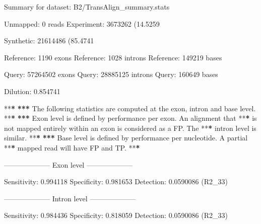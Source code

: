 \documentclass[]{article}
\newenvironment{Shaded}{\begin{snugshade}}{\end{snugshade}}
\newcommand{\DecValTok}[1]{\textcolor[rgb]{0.00,0.00,0.81}{{#1}}}
\newcommand{\FloatTok}[1]{\textcolor[rgb]{0.00,0.00,0.81}{{#1}}}
\newcommand{\StringTok}[1]{\textcolor[rgb]{0.31,0.60,0.02}{{#1}}}
\newcommand{\ErrorTok}[1]{\textbf{{#1}}}
\newcommand{\NormalTok}[1]{{#1}}
\begin{document}
\begin{Shaded}
\begin{Highlighting}[]
\NormalTok{Summary for dataset:}\StringTok{ }\NormalTok{B2/TransAlign_summary.stats}

   \NormalTok{Unmapped:}\StringTok{   }\DecValTok{0} \NormalTok{reads}
   \NormalTok{Experiment:}\StringTok{ }\DecValTok{3673262} \NormalTok{(}\FloatTok{14.5259}\NormalTok{%
   \NormalTok{Synthetic:}\StringTok{  }\DecValTok{21614486} \NormalTok{(}\FloatTok{85.4741}\NormalTok{%

   \NormalTok{Reference:}\StringTok{  }\DecValTok{1190} \NormalTok{exons}
   \NormalTok{Reference:}\StringTok{  }\DecValTok{1028} \NormalTok{introns}
   \NormalTok{Reference:}\StringTok{  }\DecValTok{149219} \NormalTok{bases}

   \NormalTok{Query:}\StringTok{      }\DecValTok{57264502} \NormalTok{exons}
   \NormalTok{Query:}\StringTok{      }\DecValTok{28885125} \NormalTok{introns}
   \NormalTok{Query:}\StringTok{      }\DecValTok{160649} \NormalTok{bases}

   \NormalTok{Dilution:}\StringTok{   }\FloatTok{0.854741}

   \NormalTok{**}\ErrorTok{*}
\StringTok{   }\ErrorTok{***}\StringTok{ }\NormalTok{The following statistics are computed at the exon, intron and base level.}
   \NormalTok{**}\ErrorTok{*}
\StringTok{   }\ErrorTok{***}\StringTok{ }\NormalTok{Exon level is defined by performance per exon. An alignment that}
   \NormalTok{**}\ErrorTok{*}\StringTok{ }\NormalTok{is not mapped entirely within an exon is considered as a FP. The}
   \NormalTok{**}\ErrorTok{*}\StringTok{ }\NormalTok{intron level is similar.}
   \NormalTok{**}\ErrorTok{*}
\StringTok{   }\ErrorTok{***}\StringTok{ }\NormalTok{Base level is defined by performance per nucleotide. A partial}
   \NormalTok{**}\ErrorTok{*}\StringTok{ }\NormalTok{mapped read will have FP and TP.}
   \NormalTok{**}\ErrorTok{*}

\StringTok{   }\NormalTok{--------------------}\StringTok{ }\NormalTok{Exon level --------------------}

\StringTok{   }\NormalTok{Sensitivity:}\StringTok{ }\FloatTok{0.994118}
   \NormalTok{Specificity:}\StringTok{ }\FloatTok{0.981653}
   \NormalTok{Detection:}\StringTok{   }\FloatTok{0.0590086} \NormalTok{(R2_33)}

   \NormalTok{--------------------}\StringTok{ }\NormalTok{Intron level --------------------}

\StringTok{   }\NormalTok{Sensitivity:}\StringTok{ }\FloatTok{0.984436}
   \NormalTok{Specificity:}\StringTok{ }\FloatTok{0.818059}
   \NormalTok{Detection:}\StringTok{   }\FloatTok{0.0590086} \NormalTok{(R2_33)}

}}
\end{Highlighting}
\end{Shaded}
\end{document}
